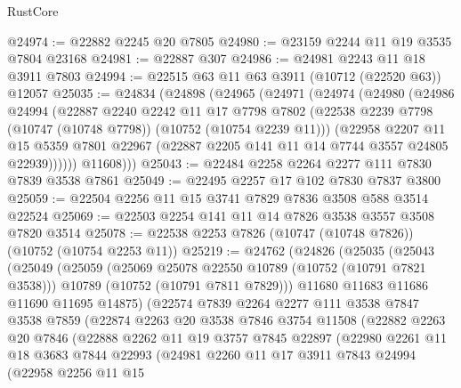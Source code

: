 \begin{lexlean}{RustCore}
\begin{coremodule}
@24974 := @22882 @2245 @20 @7805
@24980 := @23159 @2244 @11 @19 @3535 @7804 @23168
@24981 := @22887 @307
@24986 := @24981 @2243 @11 @18 @3911 @7803
@24994 := @22515 @63 @11 @63 @3911 (@10712 (@22520 @63)) @12057
@25035 := @24834
    (@24898
      (@24965
        (@24971
          (@24974
            (@24980
              (@24986
                @24994
                (@22887
                  @2240
                  @2242
                  @11
                  @17
                  @7798
                  @7802
                  (@22538 @2239 @7798 (@10747 (@10748 @7798)) (@10752 (@10754 @2239 @11)))
                  (@22958
                    @2207
                    @11
                    @15
                    @5359
                    @7801
                    @22967
                    (@22887 @2205 @141 @11 @14 @7744 @3557 @24805 @22939))))))
          @11608)))
@25043 := @22484 @2258 @2264 @2277 @111 @7830 @7839 @3538 @7861
@25049 := @22495 @2257 @17 @102 @7830 @7837 @3800
@25059 := @22504 @2256 @11 @15 @3741 @7829 @7836 @3508 @588 @3514 @22524
@25069 := @22503 @2254 @141 @11 @14 @7826 @3538 @3557 @3508 @7820 @3514
@25078 := @22538 @2253 @7826 (@10747 (@10748 @7826)) (@10752 (@10754 @2253 @11))
@25219 := @24762
    (@24826
      (@25035
        (@25043
          (@25049
            (@25059
              (@25069 @25078 @22550 @10789 (@10752 (@10791 @7821 @3538)))
              @10789
              (@10752 (@10791 @7811 @7829)))
            @11680
            @11683
            @11686
            @11690
            @11695
            @14875)
          (@22574
            @7839
            @2264
            @2277
            @111
            @3538
            @7847
            @3538
            @7859
            (@22874
              @2263
              @20
              @3538
              @7846
              @3754
              @11508
              (@22882
                @2263
                @20
                @7846
                (@22888
                  @2262
                  @11
                  @19
                  @3757
                  @7845
                  @22897
                  (@22980
                    @2261
                    @11
                    @18
                    @3683
                    @7844
                    @22993
                    (@24981
                      @2260
                      @11
                      @17
                      @3911
                      @7843
                      @24994
                      (@22958
                        @2256
                        @11
                        @15

\end{coremodule}
\end{lexlean}
